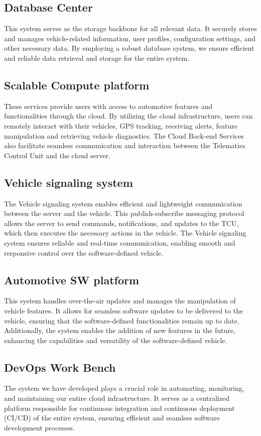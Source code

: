 \documentclass[
12pt,
oneside, 
onehalfspacing, 
nolistspacing, 
parskip, 
chapterinoneline, 
]{AASTCOMPUTER}
\begin{document}
\subsection{Database Center}
This system serves as the storage backbone for all relevant data. It securely stores and manages vehicle-related information, user profiles, configuration settings, and other necessary data. By employing a robust database system, we ensure efficient and reliable data retrieval and storage for the entire system.

\subsection{Scalable Compute platform}
These services provide users with access to automotive features and functionalities through the cloud. By utilizing the cloud infrastructure, users can remotely interact with their vehicles, GPS tracking, receiving alerts, feature manipulation and retrieving vehicle diagnostics. The Cloud Back-end Services also facilitate seamless communication and interaction between the Telematics Control Unit and the cloud server.

\subsection{Vehicle signaling system}
The Vehicle signaling system enables efficient and lightweight communication between the server and the vehicle. This publish-subscribe messaging protocol allows the server to send commands, notifications, and updates to the TCU, which then executes the necessary actions in the vehicle. The Vehicle signaling system ensures reliable and real-time communication, enabling smooth and responsive control over the software-defined vehicle.

\subsection{Automotive SW platform}
This system handles over-the-air updates and manages the manipulation of vehicle features. It allows for seamless software updates to be delivered to the vehicle, ensuring that the software-defined functionalities remain up to date. Additionally, the system enables the addition of new features in the future, enhancing the capabilities and versatility of the software-defined vehicle.

\subsection{DevOps Work Bench}
The system we have developed plays a crucial role in automating, monitoring, and maintaining our entire cloud infrastructure. It serves as a centralized platform responsible for continuous integration and continuous deployment (CI/CD) of the entire system, ensuring efficient and seamless software development processes.
\end{document}
